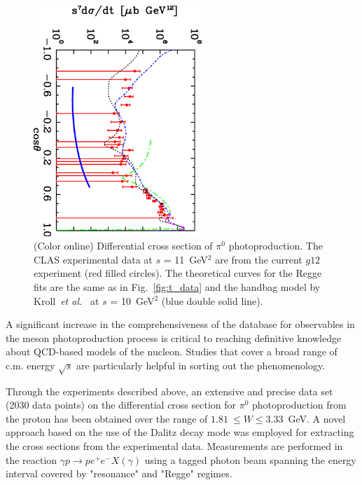 \documentclass[aps,prc,twocolumn,floatfix,showpacs,preprintnumbers,amsmath,amssymb,superscriptaddress]{revtex4-1}
\begin{document}
\begin{figure}[htb!]
\centerline{
        \includegraphics[width=2.5in, angle=90]{kroll.eps}}

        \caption {(Color online) Differential cross section 
		of $\pi^0$ photoproduction. The CLAS experimental 
		data at $s$ = 11~GeV$^2$ are from the 
		current $g12$ experiment (red filled circles).  
		The theoretical curves for the Regge 
		fits are the same as in 
		Fig.~\protect\ref{fig:t_data} and the handbag model 
		by Kroll~\protect\textit{et 
		al.}~\protect\cite{Kroll} at $s$ = 10~GeV$^2$ 
		(blue double solid line).} 
		\label{fig:kroll}
\end{figure}
A significant increase in the 
comprehensiveness of the database for observables in the meson 
photoproduction process is critical to reaching definitive 
knowledge about QCD-based models of the nucleon. Studies that 
cover a broad range of c.m. energy $\sqrt{s}$ are particularly 
helpful in sorting out the phenomenology.

Through the experiments described above, an extensive and
precise data set (2030 data points) on the differential cross section for 
$\pi^0$ photoproduction from the proton has been obtained over 
the range of $1.81~\leq W\leq 3.33$~GeV. A novel approach based 
on the use of the Dalitz decay mode was employed for extracting the 
cross sections from the experimental data. Measurements are 
performed in the reaction $\gamma p\to pe^+e^-X(\gamma)$ using a 
tagged photon beam spanning the energy interval covered by 
"resonance" and "Regge" regimes.
\end{document}
